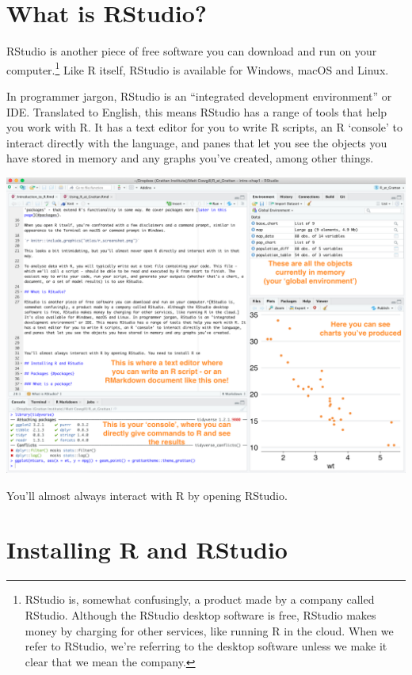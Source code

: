 \documentclass[]{book}
\let\rmarkdownfootnote\footnote%
\def\footnote{\protect\rmarkdownfootnote}
\begin{document}
\hypertarget{what-is-rstudio}{%
\section{What is RStudio?}\label{what-is-rstudio}}

RStudio is another piece of free software you can download and run on your computer.\footnote{RStudio is, somewhat confusingly, a product made by a company called RStudio. Although the RStudio desktop software is free, RStudio makes money by charging for other services, like running R in the cloud. When we refer to RStudio, we're referring to the desktop software unless we make it clear that we mean the company.} Like R itself, RStudio is available for Windows, macOS and Linux.

In programmer jargon, RStudio is an ``integrated development environment'' or IDE. Translated to English, this means RStudio has a range of tools that help you work with R. It has a text editor for you to write R scripts, an R `console' to interact directly with the language, and panes that let you see the objects you have stored in memory and any graphs you've created, among other things.

\includegraphics[width=18.4in]{atlas/rstudio_screenshot}

You'll almost always interact with R by opening RStudio.

\hypertarget{installing-r-and-rstudio}{%
\section{Installing R and RStudio}\label{installing-r-and-rstudio}}
\end{document}
